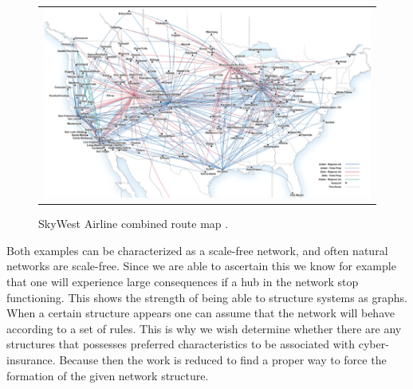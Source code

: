 \begin{figure}[h]
\centering
\begin{tabular}{@{}c@{}}
\includegraphics[width=1.0\textwidth]{../Figures/airlineRoutesUSA.png}
\end{tabular}
\caption[Caption for LOF]{SkyWest Airline combined route map \cite{airlineRoutes}.
\label{fig:airlineRouteMap}}
\end{figure}

Both examples can be characterized as a scale-free network, and often natural networks are scale-free. Since we are able to ascertain this we know for example that one will experience large consequences if a hub in the network stop functioning. 
This shows the strength of being able to structure systems as graphs. When a certain structure appears one can assume that the network will behave according to a set of rules. This is why we wish determine whether there are any structures that possesses preferred characteristics to be associated with cyber-insurance. Because then the work is reduced to find a proper way to force the formation of the given network structure.










